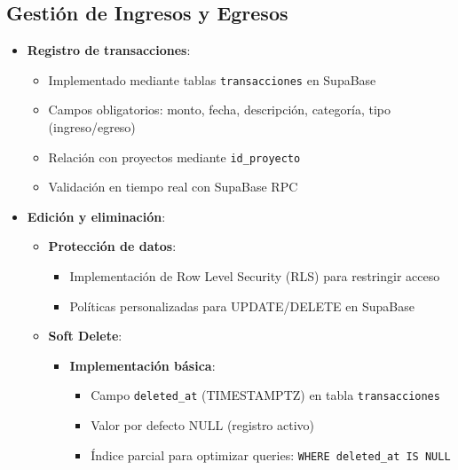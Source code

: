 \documentclass[12pt, a4paper]{article}
\begin{document}
\subsection{Gestión de Ingresos y Egresos}
\begin{itemize}
    \item \textbf{Registro de transacciones}:
    \begin{itemize}
        \item Implementado mediante tablas \texttt{transacciones} en SupaBase
        \item Campos obligatorios: monto, fecha, descripción, categoría, tipo (ingreso/egreso)
        \item Relación con proyectos mediante \texttt{id\_proyecto}
        \item Validación en tiempo real con SupaBase RPC
    \end{itemize}
    
\item \textbf{Edición y eliminación}:
\begin{itemize}
    \item \textbf{Protección de datos}:
    \begin{itemize}
        \item Implementación de Row Level Security (RLS) para restringir acceso
        \item Políticas personalizadas para UPDATE/DELETE en SupaBase
    \end{itemize}
    
\item \textbf{Soft Delete}:
\begin{itemize}
    \item \textbf{Implementación básica}:
    \begin{itemize}
        \item Campo \texttt{deleted\_at} (TIMESTAMPTZ) en tabla \texttt{transacciones}
        \item Valor por defecto NULL (registro activo)
        \item Índice parcial para optimizar queries: \texttt{WHERE deleted\_at IS NULL}
    \end{itemize}
    

\end{itemize}
\end{itemize}
\end{itemize}
\end{document}
